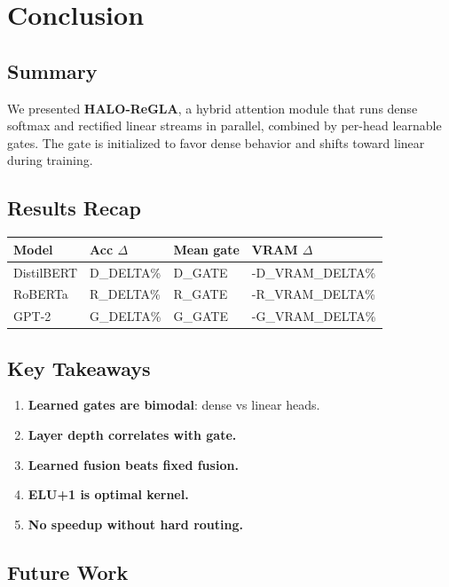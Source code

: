 
\section{Conclusion}

\subsection{Summary}

We presented \textbf{HALO-ReGLA}, a hybrid attention module that runs dense 
softmax and rectified linear streams in parallel, combined by per-head 
learnable gates. The gate is initialized to favor dense behavior and shifts 
toward linear during training.

\subsection{Results Recap}

\begin{table}[H]
\centering
\small
\begin{tabular}{llll}
\toprule
\textbf{Model} & \textbf{Acc $\Delta$} & \textbf{Mean gate} & \textbf{VRAM $\Delta$} \\
\midrule
DistilBERT & {{D\_DELTA}}\% & {{D\_GATE}} & -{{D\_VRAM\_DELTA}}\% \\
RoBERTa & {{R\_DELTA}}\% & {{R\_GATE}} & -{{R\_VRAM\_DELTA}}\% \\
GPT-2 & {{G\_DELTA}}\% & {{G\_GATE}} & -{{G\_VRAM\_DELTA}}\% \\
\bottomrule
\end{tabular}
\end{table}

\subsection{Key Takeaways}

\begin{enumerate}
\item \textbf{Learned gates are bimodal}: dense vs linear heads.
\item \textbf{Layer depth correlates with gate.}
\item \textbf{Learned fusion beats fixed fusion.}
\item \textbf{ELU+1 is optimal kernel.}
\item \textbf{No speedup without hard routing.}

\end{enumerate}
\subsection{Future Work}

